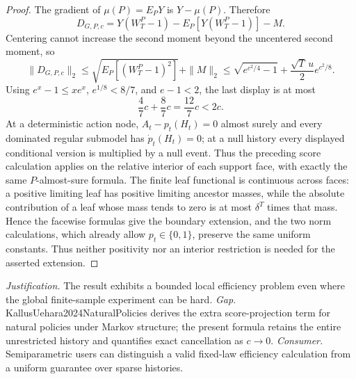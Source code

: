 \documentclass{article}
\begin{document}
\begin{proof}
The gradient of \(\mu(P)=E_PY\) is \(Y-\mu(P)\).  Therefore
\[
 D_{G,P,c}=Y(W_T^P-1)-E_P[Y(W_T^P-1)]-M.
\]
Centering cannot increase the second moment beyond the uncentered second moment, so
\[
 \|D_{G,P,c}\|_2
 \leq\sqrt{E_P[(W_T^P-1)^2]}+\|M\|_2
 \leq\sqrt{e^{c^2/4}-1}+\frac{\sqrt T\,u}{2}e^{c^2/8}.
\]
Using \(e^x-1\leq xe^x\), \(e^{1/8}<8/7\), and \(e-1<2\), the last display is at most
\[
 \frac{4}{7}c+\frac{8}{7}c=\frac{12}{7}c<2c.
\]
At a deterministic action node, \(A_t-p_t(H_t)=0\) almost surely and every dominated regular submodel has \(\dot p_t(H_t)=0\); at a null history every displayed conditional version is multiplied by a null event.  Thus the preceding score calculation applies on the relative interior of each support face, with exactly the same \(P\)-almost-sure formula.  The finite leaf functional is continuous across faces: a positive limiting leaf has positive limiting ancestor masses, while the absolute contribution of a leaf whose mass tends to zero is at most \(\delta^T\) times that mass.  Hence the facewise formulas give the boundary extension, and the two norm calculations, which already allow \(p_t\in\{0,1\}\), preserve the same uniform constants.  Thus neither positivity nor an interior restriction is needed for the asserted extension.
\end{proof}
\par\smallskip\noindent \textit{Justification.} The result exhibits a bounded local efficiency problem even where the global finite-sample experiment can be hard. \textit{Gap.} KallusUehara2024NaturalPolicies derives the extra score-projection term for natural policies under Markov structure; the present formula retains the entire unrestricted history and quantifies exact cancellation as \(c\to0\). \textit{Consumer.} Semiparametric users can distinguish a valid fixed-law efficiency calculation from a uniform guarantee over sparse histories.
\end{document}

